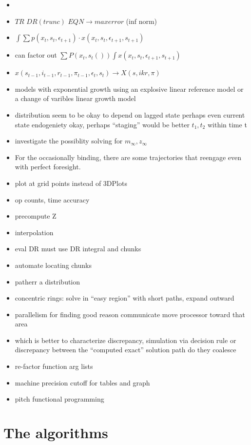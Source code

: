 \documentclass[12pt]{article}
\begin{document}
\begin{itemize}
\item 
\item $TR \,\, DR(trunc)\,\, EQN \rightarrow max error$  (inf norm)
\item $\int \sum p(x_t,s_t,\epsilon_{t+1}) \cdot x(x_t,s_t,\epsilon_{t+1},s_{t+1})$
\item can factor out $\sum P(x_t,s_t()) \int x(x_t,s_t,\epsilon_{t+1},s_{t+1})$
\item $x(s_{t-1},i_{t-1},r_{t-1},\pi_{t-1},\epsilon_t,s_t) \rightarrow X(s,ikr,\pi)$
\item models with exponential growth using an explosive linear reference model or a change of varibles linear growth model
\item distribution seem to be okay to depend on lagged state perhaps even current state endogeniety okay, perhaps ``staging'' would be better $t_1,t_2$ within time t
\item investigate the possiblity solving for $m_\infty,z_\infty$
\item For the occasionally binding, there are some trajectories that reengage even
with perfect foresight.
\item plot at grid points instead of 3DPlots
\item op counts, time accuracy
\item precompute Z
\item interpolation
\item eval DR must use DR integral and chunks
\item automate locating chunks
\item patherr a distribution
\item concentric rings: solve in ``easy region'' with short paths, expand outward
\item parallelism for finding good reason communicate move processor toward that area
\item which is better to characterize discrepancy, simulation via decision rule or discrepancy between the ``computed exact'' solution path  do they coalesce
\item re-factor function arg lists
\item machine precision cutoff for tables and graph
\item pitch functional programming
\end{itemize}
\section{The algorithms}
\label{sec:algorithms}
\end{document}
